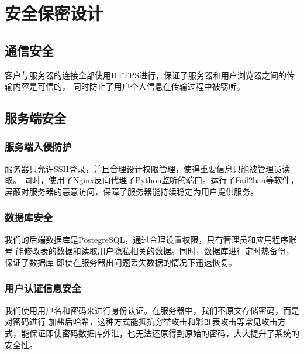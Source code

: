\chapter{安全保密设计}

\section{通信安全}

客户与服务器的连接全部使用HTTPS进行，保证了服务器和用户浏览器之间的传输内容是可信的，
同时防止了用户个人信息在传输过程中被窃听。

\section{服务端安全}

\subsection{服务端入侵防护}

服务器只允许SSH登录，并且合理设计权限管理，使得重要信息只能被管理员读取。
同时，使用了Nginx反向代理了Python监听的端口。运行了Fail2ban等软件，
屏蔽对服务器的恶意访问，保障了服务器能持续稳定为用户提供服务。

\subsection{数据库安全}

我们的后端数据库是PostegreSQL，通过合理设置权限，只有管理员和应用程序账号
能修改表的数据和读取用户隐私相关的数据。同时，数据库进行定时热备份，保证了数据库
即使在服务器出问题丢失数据的情况下迅速恢复。

\subsection{用户认证信息安全}

我们使用用户名和密码来进行身份认证。在服务器中，我们不原文存储密码，而是对密码进行
加盐后哈希，这种方式能抵抗穷举攻击和彩虹表攻击等常见攻击方式，能保证即使密码数据库外泄，也无法还原得到原始的密码，大大提升了系统的安全性。